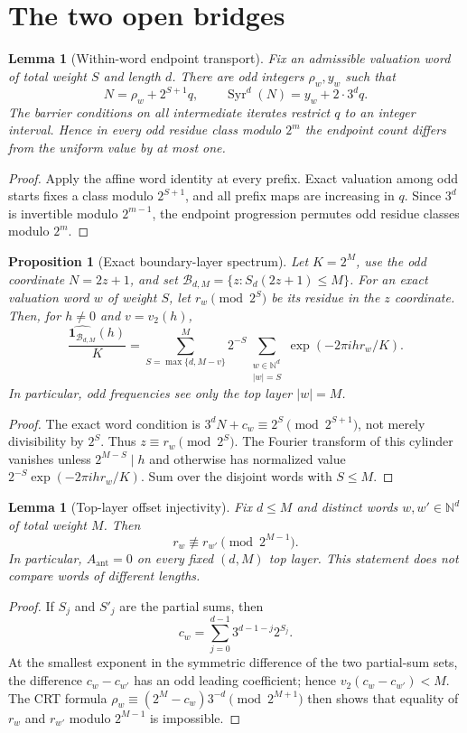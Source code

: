 \documentclass[12pt,a4paper]{article}
\newtheorem{proposition}[theorem]{Proposition}
\newtheorem{lemma}[theorem]{Lemma}
\theoremstyle{remark}
\begin{document}
\section*{The two open bridges}

\begin{lemma}[Within-word endpoint transport]
Fix an admissible valuation word of total weight $S$ and length $d$.  There are
odd integers $\rho_w,y_w$ such that
\[
 N=\rho_w+2^{S+1}q,
 \qquad
 \operatorname{Syr}^d(N)=y_w+2\cdot3^dq.
\]
The barrier conditions on all intermediate iterates restrict $q$ to an integer
interval.  Hence in every odd residue class modulo $2^m$ the endpoint count
differs from the uniform value by at most one.
\end{lemma}
\begin{proof}
Apply the affine word identity at every prefix.  Exact valuation among odd
starts fixes a class modulo $2^{S+1}$, and all prefix maps are increasing in
$q$.  Since $3^d$ is invertible modulo $2^{m-1}$, the endpoint progression
permutes odd residue classes modulo $2^m$.
\end{proof}

\begin{proposition}[Exact boundary-layer spectrum]
Let $K=2^M$, use the odd coordinate $N=2z+1$, and set
$\mathcal B_{d,M}=\{z:S_d(2z+1)\le M\}$.  For an exact valuation word $w$
of weight $S$, let $r_w\pmod{2^S}$ be its residue in the $z$ coordinate.
Then, for $h\ne0$ and $v=v_2(h)$,
\[
 \frac{\widehat{\mathbf1_{\mathcal B_{d,M}}}(h)}K
 =\sum_{S=\max\{d,M-v\}}^M2^{-S}
   \sum_{\substack{w\in\mathbb N^d\\|w|=S}}
   \exp(-2\pi i h r_w/K).
\]
In particular, odd frequencies see only the top layer $|w|=M$.
\end{proposition}
\begin{proof}
The exact word condition is
$3^dN+c_w\equiv2^S\pmod{2^{S+1}}$, not merely divisibility by $2^S$.
Thus $z\equiv r_w\pmod{2^S}$.  The Fourier transform of this cylinder
vanishes unless $2^{M-S}\mid h$ and otherwise has normalized value
$2^{-S}\exp(-2\pi i h r_w/K)$.  Sum over the disjoint words with $S\le M$.
\end{proof}
\begin{lemma}[Top-layer offset injectivity]
Fix $d\le M$ and distinct words $w,w'\in\mathbb N^d$ of total weight $M$.
Then
\[
 r_w\not\equiv r_{w'}\pmod{2^{M-1}}.
\]
In particular, $A_{\mathrm{ant}}=0$ on every fixed $(d,M)$ top layer.
This statement does not compare words of different lengths.
\end{lemma}
\begin{proof}
If $S_j$ and $S'_j$ are the partial sums, then
\[
 c_w=\sum_{j=0}^{d-1}3^{d-1-j}2^{S_j}.
\]
At the smallest exponent in the symmetric difference of the two partial-sum
sets, the difference $c_w-c_{w'}$ has an odd leading coefficient; hence
$v_2(c_w-c_{w'})<M$.  The CRT formula
$\rho_w\equiv(2^M-c_w)3^{-d}\pmod{2^{M+1}}$ then shows that equality of
$r_w$ and $r_{w'}$ modulo $2^{M-1}$ is impossible.
\end{proof}
\end{document}

